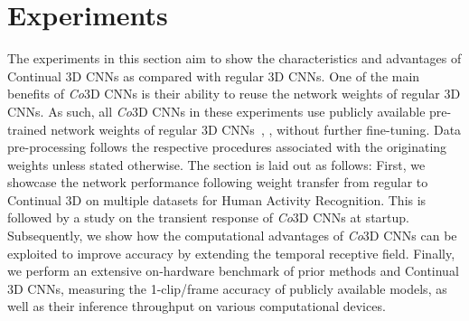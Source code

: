 \documentclass[runningheads]{llncs}
\begin{document}
 \vspace{-2mm}
\section{Experiments} 
\vspace{-2mm}
The experiments in this section aim to show the characteristics and advantages of Continual 3D CNNs as compared with regular 3D CNNs.
One of the main benefits of \textit{Co}3D CNNs is their ability to reuse the network weights of regular 3D CNNs. 
As such, all \textit{Co}3D CNNs in these experiments use publicly available pre-trained network weights of regular 3D CNNs~\cite{feichtenhofer2019slowfast}, \cite{feichtenhofer2020x3d}, \cite{fan2021pytorchvideo} without further fine-tuning.
Data pre-processing follows the respective procedures associated with the originating weights unless stated otherwise.
The section is laid out as follows: 
First, we showcase the network performance following weight transfer from regular to Continual 3D on multiple datasets for Human Activity Recognition. This is followed by a study on the transient response of \textit{Co}3D CNNs at startup.
Subsequently, we show how the computational advantages of \textit{Co}3D CNNs can be exploited to improve accuracy by extending the temporal receptive field.
Finally, we perform an extensive on-hardware benchmark of prior methods and Continual 3D CNNs, measuring the 1-clip/frame accuracy of publicly available models, as well as their inference throughput on various computational devices.
\end{document}
